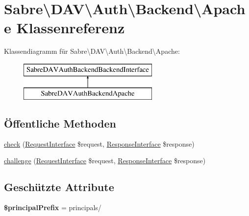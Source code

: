 \hypertarget{class_sabre_1_1_d_a_v_1_1_auth_1_1_backend_1_1_apache}{}\section{Sabre\textbackslash{}D\+AV\textbackslash{}Auth\textbackslash{}Backend\textbackslash{}Apache Klassenreferenz}
\label{class_sabre_1_1_d_a_v_1_1_auth_1_1_backend_1_1_apache}
Klassendiagramm für Sabre\textbackslash{}D\+AV\textbackslash{}Auth\textbackslash{}Backend\textbackslash{}Apache\+:\begin{figure}[H]
\begin{center}
\leavevmode
\includegraphics[height=2.000000cm]{class_sabre_1_1_d_a_v_1_1_auth_1_1_backend_1_1_apache}
\end{center}
\end{figure}
\subsection*{Öffentliche Methoden}
\begin{DoxyCompactItemize}
\item 
\mbox{\hyperlink{class_sabre_1_1_d_a_v_1_1_auth_1_1_backend_1_1_apache_ab3d666cc6cc048bd766d26e1a9048cf9}{check}} (\mbox{\hyperlink{interface_sabre_1_1_h_t_t_p_1_1_request_interface}{Request\+Interface}} \$request, \mbox{\hyperlink{interface_sabre_1_1_h_t_t_p_1_1_response_interface}{Response\+Interface}} \$response)
\item 
\mbox{\hyperlink{class_sabre_1_1_d_a_v_1_1_auth_1_1_backend_1_1_apache_ab15a45837c02291e2a941136af47aa02}{challenge}} (\mbox{\hyperlink{interface_sabre_1_1_h_t_t_p_1_1_request_interface}{Request\+Interface}} \$request, \mbox{\hyperlink{interface_sabre_1_1_h_t_t_p_1_1_response_interface}{Response\+Interface}} \$response)
\end{DoxyCompactItemize}
\subsection*{Geschützte Attribute}
\begin{DoxyCompactItemize}
\item 
\mbox{\label{class_sabre_1_1_d_a_v_1_1_auth_1_1_backend_1_1_apache_a6ac30c835e88a17a95e83d9e5a3910de}} 
{\bfseries \$principal\+Prefix} = \textquotesingle{}principals/\textquotesingle{}
\end{DoxyCompactItemize}



